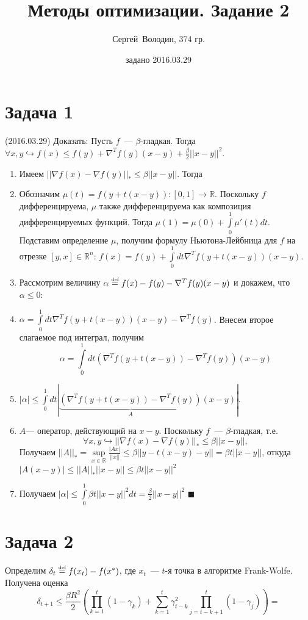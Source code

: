 \documentclass[a4paper]{article}
\title{Методы оптимизации. Задание 2}
\date{задано 2016.03.29}
\author{Сергей~Володин, 374 гр.}
\def\eqdef{\overset{\mbox{\tiny def}}{=}}
\begin{document}
\maketitle
\section*{Задача 1}
(2016.03.29)
Доказать: Пусть $f$~--- $\beta$-гладкая. Тогда $\forall x,y \hookrightarrow f(x)\leqslant f(y)+\nabla^Tf(y)(x-y)+\frac{\beta}{2}||x-y||^2$.

\begin{enumerate}
	\item Имеем $||\nabla f(x)-\nabla f(y)||_*\leqslant \beta ||x-y||$. Тогда 
	\item Обозначим $\mu(t)=f(y+t(x-y))\colon [0,1]\to\mathbb{R}$. Поскольку $f$ дифференцируема, $\mu$ также дифференцируема как композиция дифференцируемых функций. Тогда $\mu(1)=\mu(0)+\int\limits_0^1\mu'(t)dt$. Подставим определение $\mu$, получим формулу Ньютона-Лейбница для $f$ на отрезке $[y,x]\in\mathbb{R}^n$: $f(x)=f(y)+\int\limits_0^1 dt \nabla^Tf(y+t(x-y))(x-y)$.
	\item Рассмотрим величину $\alpha\eqdef f(x)-f(y)-\nabla^Tf(y)(x-y)$ и докажем, что $\alpha\leqslant 0$:
	\item $\alpha=\int\limits_0^1 dt \nabla^Tf(y+t(x-y))(x-y)-\nabla^Tf(y)$. Внесем второе слагаемое под интеграл, получим
	$$\alpha=\int\limits_0^1 dt \left(\nabla^T f(y+t(x-y))-\nabla^T f(y)\right)(x-y)$$
	\item $|\alpha|\leqslant\int\limits_0^1 dt |\underbrace{\left(\nabla^T f(y+t(x-y))-\nabla^T f(y)\right)}_{A}(x-y)|$.
	\item $A$--- оператор, действующий на $x-y$. Поскольку $f$~--- $\beta$-гладкая, т.е. $$\forall x,y\hookrightarrow ||\nabla f(x) - \nabla f(y)||_*\leqslant \beta ||x-y||,$$
	Получаем $||A||_*=\sup\limits_{x\in\mathbb{R}}\frac{|Ax|}{||x||}\leqslant \beta ||y-t(x-y)-y||=\beta t ||x-y||$, откуда $|A(x-y)|\leqslant ||A||_*||x-y||\leqslant \beta t||x-y||^2$
	\item Получаем $|\alpha|\leqslant \int\limits_0^1 \beta t ||x-y||^2 dt = \frac{\beta}{2}||x-y||^2$ $\blacksquare$
\end{enumerate}
\section*{Задача 2}
Определим $\delta_t\eqdef f(x_t)-f(x^*)$, где $x_t$~--- $t$-я точка в алгоритме Frank-Wolfe. Получена оценка
$$\delta_{t+1}\leqslant \frac{\beta R^2}{2}\left(\prod\limits_{k=1}^t(1-\gamma_k)+\sum\limits_{k=1}^t\gamma^2_{t-k}\prod\limits_{j=t-k+1}^t(1-\gamma_j)\right)\boxed{=}$$
\end{document}
